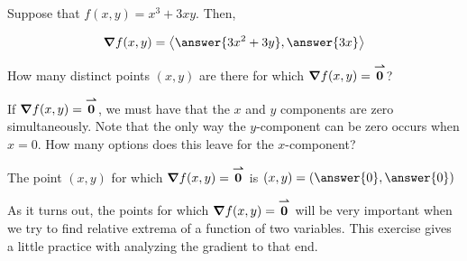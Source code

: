 \documentclass{ximera}
\author{Jim Talamo}
\begin{document}
\begin{exercise}
Suppose that $f(x,y) =x^3+3xy$.  Then,

\begin{align*}
\grad{f}(x,y) &= \vector{\answer{3x^2+3y},\answer{3x}} \\
\end{align*}

\begin{exercise}
How many distinct points $(x,y)$ are there for which $\boldsymbol\nabla{f}(x,y) = {\overset{\boldsymbol{\rightharpoonup}}{\mathbf{0}}}$?

\begin{multipleChoice}
\end{multipleChoice}

\begin{hint}
If $\boldsymbol\nabla{f}(x,y) = {\overset{\boldsymbol{\rightharpoonup}}{\mathbf{0}}}$, we must have that the $x$ and $y$ components are zero simultaneously.  Note that the only way the $y$-component can be zero occurs when $x=0$.  How many options does this leave for the $x$-component?
\end{hint}

\begin{exercise}
The point $(x,y)$ for which $\boldsymbol\nabla{f}(x,y) = {\overset{\boldsymbol{\rightharpoonup}}{\mathbf{0}}}$ is $(x,y) = \left(\answer{0},\answer{0} \right)$


\begin{remark}
As it turns out, the points for which $\boldsymbol\nabla{f}(x,y) = {\overset{\boldsymbol{\rightharpoonup}}{\mathbf{0}}}$ will be very important when we try to find relative extrema of a function of two variables.  This exercise gives a little practice with analyzing the gradient to that end.
\end{remark}
\end{exercise}
\end{exercise}
\end{exercise}
\end{document}
